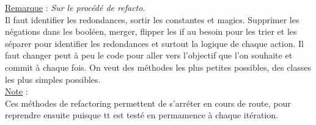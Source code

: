 \documentclass[a4paper,12pt,twoside]{article}
\newcommand{\rem}[2]{\noindent\underline{Remarque} : \textit{#1}.\\ \indent #2}
\newcommand{\note}[1]{\noindent\underline{Note} : \\ \indent #1}
\begin{document}
\rem{Sur le procédé de refacto}{Il faut identifier les redondances, sortir les constantes et magics. Supprimer les négations dans les booléen, merger, flipper les if au besoin pour les trier et les séparer pour identifier les redondances et surtout la logique de chaque action. Il faut changer peut à peu le code pour aller vers l'objectif que l'on souhaite et commit à chaque fois. On veut des méthodes les plus petites possibles, des classes les plus simples possibles.}\\

\note{Ces méthodes de refactoring permettent de s'arréter en cours de route, pour reprendre ensuite puisque tt est testé en permamence à chaque itération.}\\

\end{document}
